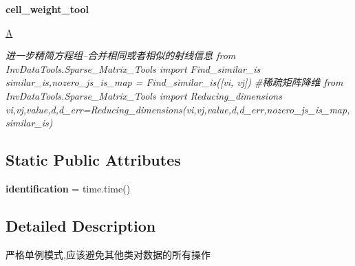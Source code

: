 \begin{DoxyCompactItemize}
{\bfseries cell\+\_\+weight\+\_\+tool}
\item 
\mbox{\label{classMIS_1_1Muon__Imaging__Algorithm_1_1InvDataFactory_1_1DataManage_1_1DataManager_a8e3450593972362fcb1d22da11490140}} 
\hyperlink{classMIS_1_1Muon__Imaging__Algorithm_1_1InvDataFactory_1_1DataManage_1_1DataManager_a8e3450593972362fcb1d22da11490140}{A}
\begin{DoxyCompactList}\small\item\em 进一步精简方程组--合并相同或者相似的射线信息 from Inv\+Data\+Tools.\+Sparse\+\_\+\+Matrix\+\_\+\+Tools import Find\+\_\+similar\+\_\+is similar\+\_\+is,nozero\+\_\+js\+\_\+is\+\_\+map = Find\+\_\+similar\+\_\+is(\mbox{[}vi, vj\mbox{]}) \#稀疏矩阵降维 from Inv\+Data\+Tools.\+Sparse\+\_\+\+Matrix\+\_\+\+Tools import Reducing\+\_\+dimensions vi,vj,value,d,d\+\_\+err=Reducing\+\_\+dimensions(vi,vj,value,d,d\+\_\+err,nozero\+\_\+js\+\_\+is\+\_\+map,similar\+\_\+is) \end{DoxyCompactList}\end{DoxyCompactItemize}
\subsection*{Static Public Attributes}
\begin{DoxyCompactItemize}
\item 
\mbox{\label{classMIS_1_1Muon__Imaging__Algorithm_1_1InvDataFactory_1_1DataManage_1_1DataManager_a5a326197fd727709e64562208bd865b2}} 
{\bfseries identification} = time.\+time()
\end{DoxyCompactItemize}


\subsection{Detailed Description}
\begin{DoxyVerb}严格单例模式,应该避免其他类对数据的所有操作
\end{DoxyVerb}
 

